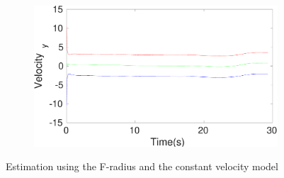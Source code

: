 \begin{figure}[h]
\begin{subfigure}{.5\linewidth}
\end{subfigure}
\begin{subfigure}{.5\linewidth}
\centering
\includegraphics[width=\linewidth]{figures/Frad/s3cvSMVelocity_y}
\end{subfigure}
\caption{Estimation using the F-radius and the constant velocity model}
\end{figure}

